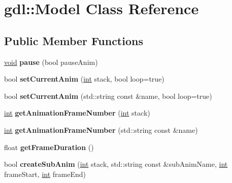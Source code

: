 \hypertarget{classgdl_1_1_model}{}\section{gdl\+:\+:Model Class Reference}
\label{classgdl_1_1_model}
\subsection*{Public Member Functions}
\begin{DoxyCompactItemize}
\item 
\hypertarget{classgdl_1_1_model_a2880a8151a0a076dccc17c8a12530dcc}{}\hyperlink{_s_d_l__audio_8h_a52835ae37c4bb905b903cbaf5d04b05f}{void} {\bfseries pause} (bool pause\+Anim)\label{classgdl_1_1_model_a2880a8151a0a076dccc17c8a12530dcc}

\item 
\hypertarget{classgdl_1_1_model_a223b04dc9a2007ac22cc71d019af5749}{}bool {\bfseries set\+Current\+Anim} (\hyperlink{_s_d_l__thread_8h_a6a64f9be4433e4de6e2f2f548cf3c08e}{int} stack, bool loop=true)\label{classgdl_1_1_model_a223b04dc9a2007ac22cc71d019af5749}

\item 
\hypertarget{classgdl_1_1_model_ac4210edf1cfc619f8948e83820b41ca9}{}bool {\bfseries set\+Current\+Anim} (std\+::string const \&name, bool loop=true)\label{classgdl_1_1_model_ac4210edf1cfc619f8948e83820b41ca9}

\item 
\hypertarget{classgdl_1_1_model_a6c07ff9af9e5f21976f74c76969c5209}{}\hyperlink{_s_d_l__thread_8h_a6a64f9be4433e4de6e2f2f548cf3c08e}{int} {\bfseries get\+Animation\+Frame\+Number} (\hyperlink{_s_d_l__thread_8h_a6a64f9be4433e4de6e2f2f548cf3c08e}{int} stack)\label{classgdl_1_1_model_a6c07ff9af9e5f21976f74c76969c5209}

\item 
\hypertarget{classgdl_1_1_model_a2f46e23c1f5bbf46724ab88d4e09edeb}{}\hyperlink{_s_d_l__thread_8h_a6a64f9be4433e4de6e2f2f548cf3c08e}{int} {\bfseries get\+Animation\+Frame\+Number} (std\+::string const \&name)\label{classgdl_1_1_model_a2f46e23c1f5bbf46724ab88d4e09edeb}

\item 
\hypertarget{classgdl_1_1_model_a145f9bb956d043c28f23d8714e72447c}{}float {\bfseries get\+Frame\+Duration} ()\label{classgdl_1_1_model_a145f9bb956d043c28f23d8714e72447c}

\item 
\hypertarget{classgdl_1_1_model_ac903e3a9a4da067bf245a26e4bb02fd0}{}bool {\bfseries create\+Sub\+Anim} (\hyperlink{_s_d_l__thread_8h_a6a64f9be4433e4de6e2f2f548cf3c08e}{int} stack, std\+::string const \&sub\+Anim\+Name, \hyperlink{_s_d_l__thread_8h_a6a64f9be4433e4de6e2f2f548cf3c08e}{int} frame\+Start, \hyperlink{_s_d_l__thread_8h_a6a64f9be4433e4de6e2f2f548cf3c08e}{int} frame\+End)\label{classgdl_1_1_model_ac903e3a9a4da067bf245a26e4bb02fd0}


\end{DoxyCompactItemize}
